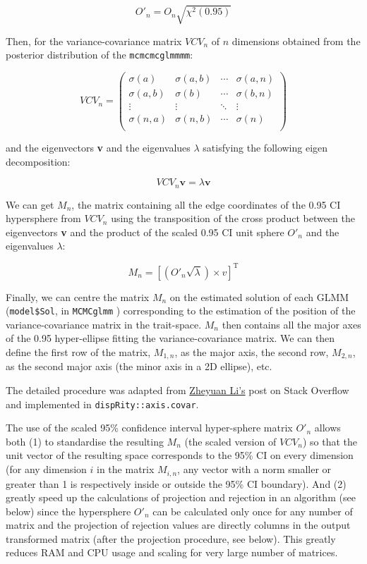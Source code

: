 \documentclass[12pt,a4paper]{article}
\begin{document}
$$O'_{n} = O_{n} \sqrt{\chi^2(0.95)}$$

Then, for the variance-covariance matrix $VCV_{n}$ of $n$ dimensions obtained from the posterior distribution of the \texttt{mcmcmcglmmmm}:

\begin{equation}
VCV_{n} = 
    \begin{pmatrix}
        \sigma(a) & \sigma(a,b) & \cdots & \sigma(a,n) \\
        \sigma(a,b) & \sigma(b) & \cdots & \sigma(b,n) \\
        \vdots  & \vdots  & \ddots & \vdots  \\
        \sigma(n,a) & \sigma(n,b) & \cdots & \sigma(n) \\
    \end{pmatrix}
\end{equation}

and the eigenvectors \textbf{v} and the eigenvalues $\lambda$ satisfying the following eigen decomposition:

$$VCV_{n} \textbf{v} = \lambda \textbf{v}$$

We can get $M_{n}$, the matrix containing all the edge coordinates of the 0.95 CI hypersphere from $VCV_{n}$ using the transposition of the cross product between the eigenvectors \textbf{v} and the product of the scaled 0.95 CI unit sphere $O'_{n}$ and the eigenvalues $\lambda$:

$$M_{n} = [(O'_{n}\sqrt{\lambda}) \times v]^{\text{T}}$$

Finally, we can centre the matrix $M_{n}$ on the estimated solution of each GLMM (\texttt{model\$Sol}, in \texttt{MCMCglmm} \cite{MCMCglmm}) corresponding to the estimation of the position of the variance-covariance matrix in the trait-space.
$M_{n}$ then contains all the major axes of the 0.95 hyper-ellipse fitting the variance-covariance matrix.
We can then define the first row of the matrix, $M_{1,n}$, as the major axis, the second row, $M_{2,n}$, as the second major axis (the minor axis in a 2D ellipse), etc.

The detailed procedure was adapted from \href{https://stackoverflow.com/questions/40300217/obtain-vertices-of-the-ellipse-on-an-ellipse-covariance-plot-created-by-care/40316331#40316331}{Zheyuan Li's} post on Stack Overflow and implemented in \texttt{dispRity::axis.covar}.

The use of the scaled 95\% confidence interval hyper-sphere matrix $O'_{n}$ allows both (1) to standardise the resulting $M_{n}$ (the scaled version of $VCV_{n}$) so that the unit vector of the resulting space corresponds to the 95\% CI on every dimension (for any dimension $i$ in the matrix $M_{i,n}$, any vector with a norm smaller or greater than 1 is respectively inside or outside the 95\% CI boundary).
And (2) greatly speed up the calculations of projection and rejection in an algorithm (see below) since the hypersphere $O'_{n}$ can be calculated only once for any number of matrix and the projection of rejection values are directly columns in the output transformed matrix (after the projection procedure, see below).
This greatly reduces RAM and CPU usage and scaling for very large number of matrices.
\end{document}
